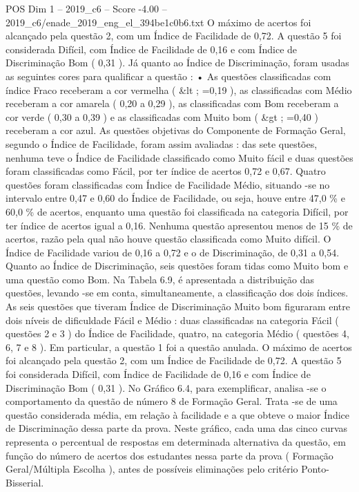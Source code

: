 \begin{textsample}{POS Dim 1 – 2019\_c6 – Score -4.00 – 2019\_c6/enade\_2019\_eng\_el\_394be1c0b6.txt}
O máximo de acertos foi alcançado pela questão 2, com um Índice de Facilidade de 0,72.
A questão 5 foi considerada Difícil, com Índice de Facilidade de 0,16 e com Índice de Discriminação Bom ( 0,31 ).
Já quanto ao Índice de Discriminação, foram usadas as seguintes cores para qualificar a questão : • As questões classificadas com índice Fraco receberam a cor vermelha ( \&lt ; =0,19 ), as classificadas com Médio receberam a cor amarela ( 0,20 a 0,29 ), as classificadas com Bom receberam a cor verde ( 0,30 a 0,39 ) e as classificadas com Muito bom ( \&gt ; =0,40 ) receberam a cor azul.
As questões objetivas do Componente de Formação Geral, segundo o Índice de Facilidade, foram assim avaliadas : das sete questões, nenhuma teve o Índice de Facilidade classificado como Muito fácil e duas questões foram classificadas como Fácil, por ter índice de acertos 0,72 e 0,67.
Quatro questões foram classificadas com Índice de Facilidade Médio, situando -se no intervalo entre 0,47 e 0,60 do Índice de Facilidade, ou seja, houve entre 47,0 \% e 60,0 \% de acertos, enquanto uma questão foi classificada na categoria Difícil, por ter índice de acertos igual a 0,16.
Nenhuma questão apresentou menos de 15 \% de acertos, razão pela qual não houve questão classificada como Muito difícil.
O Índice de Facilidade variou de 0,16 a 0,72 e o de Discriminação, de 0,31 a 0,54.
Quanto ao Índice de Discriminação, seis questões foram tidas como Muito bom e uma questão como Bom.
Na Tabela 6.9, é apresentada a distribuição das questões, levando -se em conta, simultaneamente, a classificação dos dois índices.
As seis questões que tiveram Índice de Discriminação Muito bom figuraram entre dois níveis de dificuldade Fácil e Médio : duas classificadas na categoria Fácil ( questões 2 e 3 ) do Índice de Facilidade, quatro, na categoria Médio ( questões 4, 6, 7 e 8 ).
Em particular, a questão 1 foi a questão anulada.
O máximo de acertos foi alcançado pela questão 2, com um Índice de Facilidade de 0,72.
A questão 5 foi considerada Difícil, com Índice de Facilidade de 0,16 e com Índice de Discriminação Bom ( 0,31 ).
No Gráfico 6.4, para exemplificar, analisa -se o comportamento da questão de número 8 de Formação Geral.
Trata -se de uma questão considerada média, em relação à facilidade e a que obteve o maior Índice de Discriminação dessa parte da prova.
Neste gráfico, cada uma das cinco curvas representa o percentual de respostas em determinada alternativa da questão, em função do número de acertos dos estudantes nessa parte da prova ( Formação Geral/Múltipla Escolha ), antes de possíveis eliminações pelo critério Ponto-Bisserial.

\end{textsample}
